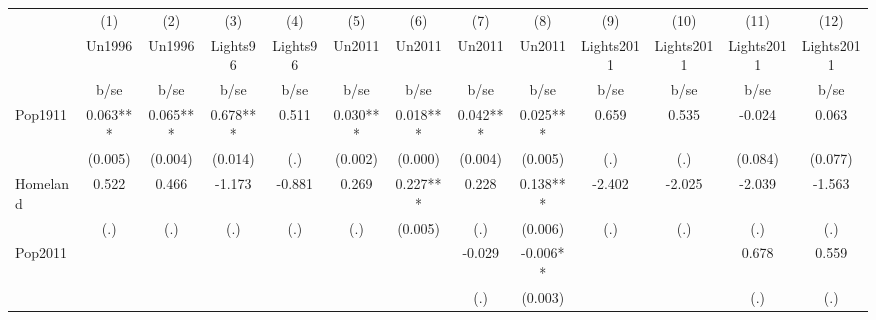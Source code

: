 {
\def\sym#1{\ifmmode^{#1}\else\(^{#1}\)\fi}
\begin{tabular}{l*{12}{c}}
\hline\hline
                    &\multicolumn{1}{c}{(1)}&\multicolumn{1}{c}{(2)}&\multicolumn{1}{c}{(3)}&\multicolumn{1}{c}{(4)}&\multicolumn{1}{c}{(5)}&\multicolumn{1}{c}{(6)}&\multicolumn{1}{c}{(7)}&\multicolumn{1}{c}{(8)}&\multicolumn{1}{c}{(9)}&\multicolumn{1}{c}{(10)}&\multicolumn{1}{c}{(11)}&\multicolumn{1}{c}{(12)}\\
                    &\multicolumn{1}{c}{Un1996}&\multicolumn{1}{c}{Un1996}&\multicolumn{1}{c}{Lights96}&\multicolumn{1}{c}{Lights96}&\multicolumn{1}{c}{Un2011}&\multicolumn{1}{c}{Un2011}&\multicolumn{1}{c}{Un2011}&\multicolumn{1}{c}{Un2011}&\multicolumn{1}{c}{Lights2011}&\multicolumn{1}{c}{Lights2011}&\multicolumn{1}{c}{Lights2011}&\multicolumn{1}{c}{Lights2011}\\
                    &        b/se   &        b/se   &        b/se   &        b/se   &        b/se   &        b/se   &        b/se   &        b/se   &        b/se   &        b/se   &        b/se   &        b/se   \\
\hline
Pop1911             &       0.063***&       0.065***&       0.678***&       0.511   &       0.030***&       0.018***&       0.042***&       0.025***&       0.659   &       0.535   &      -0.024   &       0.063   \\
                    &     (0.005)   &     (0.004)   &     (0.014)   &         (.)   &     (0.002)   &     (0.000)   &     (0.004)   &     (0.005)   &         (.)   &         (.)   &     (0.084)   &     (0.077)   \\
Homeland            &       0.522   &       0.466   &      -1.173   &      -0.881   &       0.269   &       0.227***&       0.228   &       0.138***&      -2.402   &      -2.025   &      -2.039   &      -1.563   \\
                    &         (.)   &         (.)   &         (.)   &         (.)   &         (.)   &     (0.005)   &         (.)   &     (0.006)   &         (.)   &         (.)   &         (.)   &         (.)   \\
Pop2011             &               &               &               &               &               &               &      -0.029   &      -0.006** &               &               &       0.678   &       0.559   \\
                    &               &               &               &               &               &               &         (.)   &     (0.003)   &               &               &         (.)   &         (.)   \\

\end{tabular}}
